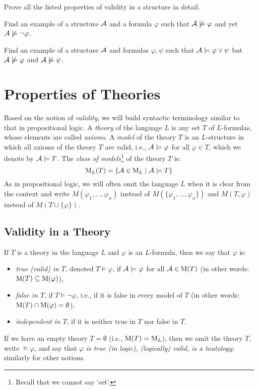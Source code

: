 \begin{exercise}
    Prove all the listed properties of validity in a structure in detail.
\end{exercise}

\begin{exercise}
    Find an example of a structure $\mathcal{A}$ and a formula $\varphi$ such that $\mathcal{A}\not\models\varphi$ and yet $\mathcal{A}\not\models\neg\varphi$.
\end{exercise}

\begin{exercise}
    Find an example of a structure $\mathcal{A}$ and formulas $\varphi,\psi$ such that $\mathcal{A}\models\varphi\lor\psi$ but $\mathcal{A}\not\models\varphi$ and $\mathcal{A}\not\models\psi$.
\end{exercise}


\section{Properties of Theories}

Based on the notion of \emph{validity}, we will build syntactic terminology similar to that in propositional logic. A \emph{theory} of the language $L$ is any set $T$ of $L$-formulas, whose elements are called \emph{axioms}. A \emph{model} of the theory $T$ is an $L$-structure in which all axioms of the theory $T$ are valid, i.e., $\mathcal{A}\models\varphi$ for all $\varphi\in T$, which we denote by $\mathcal{A}\models T$. The \emph{class of models}\footnote{Recall that we cannot say `set'.} of the theory $T$ is:
$$
\operatorname{M}_L(T)=\{\mathcal{A}\in\operatorname{M}_L\mid\mathcal{A}\models T\}
$$
As in propositional logic, we will often omit the language $L$ when it is clear from the context and write $M(\varphi_1,\dots,\varphi_n)$ instead of $M(\{\varphi_1,\dots,\varphi_n\})$ and $M(T,\varphi)$ instead of $M(T\cup\{\varphi\})$.

\subsection{Validity in a Theory}

If $T$ is a theory in the language $L$ and $\varphi$ is an $L$-formula, then we say that $\varphi$ is: 
\begin{itemize}
    \item \emph{true (valid) in $T$}, denoted $T\models\varphi$, if $\mathcal{A}\models\varphi$ for all $\mathcal{A}\in\operatorname{M}(T)$ (in other words: $\operatorname{M}(T)\subseteq\operatorname{M}(\varphi)$),
    \item \emph{false in $T$}, if $T\models\neg\varphi$, i.e., if it is false in every model of $T$ (in other words: $\operatorname{M}(T)\cap\operatorname{M}(\varphi)=\emptyset$),
    \item \emph{independent in $T$}, if it is neither true in $T$ nor false in $T$.
\end{itemize}
If we have an empty theory $T=\emptyset$ (i.e., $\operatorname{M}(T)=\operatorname{M}_L$), then we omit the theory $T$, write $\models\varphi$, and say that $\varphi$ \emph{is true (in logic), (logically) valid, is a tautology}; similarly for other notions.

